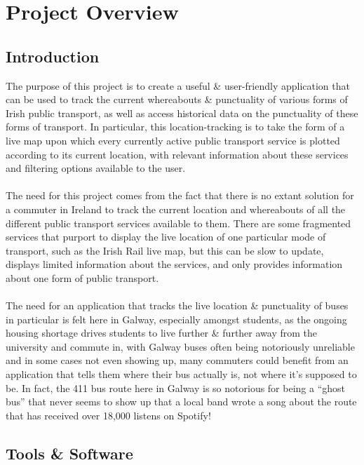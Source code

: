 \documentclass[a4paper,11pt]{article}
\begin{document}
\newpage
\tableofcontents
\newpage
\setcounter{page}{1}

\section{Project Overview}
\subsection{Introduction}
The purpose of this project is to create a useful \& user-friendly application that can be used to track the current whereabouts \& punctuality of various forms of Irish public transport, as well as access historical data on the punctuality of these forms of transport.
In particular, this location-tracking is to take the form of a live map upon which every currently active public transport service is plotted according to its current location, with relevant information about these services and filtering options available to the user.
\\\\
The need for this project comes from the fact that there is no extant solution for a commuter in Ireland to track the current location and whereabouts of all the different public transport services available to them.
There are some fragmented services that purport to display the live location of one particular mode of transport, such as the Irish Rail live map\supercite{liveir}, but this can be slow to update, displays limited information about the services, and only provides information about one form of public transport.
\\\\
The need for an application that tracks the live location \& punctuality of buses in particular is felt here in Galway, especially amongst students, as the ongoing housing shortage drives students to live further \& further away from the university and commute in, with Galway buses often being notoriously unreliable and in some cases not even showing up, many commuters could benefit from an application that tells them where their bus actually is, not where it's supposed to be.
In fact, the 411 bus route here in Galway is so notorious for being a ``ghost bus'' that never seems to show up that a local band wrote a song about the route that has received over 18,000 listens on Spotify\supercite{411}!

\subsection{Tools \& Software}
\end{document}
